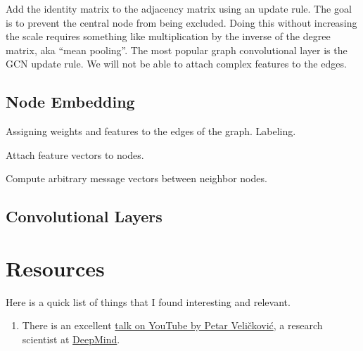 Add the identity matrix to the adjacency matrix using an update rule. 
The goal is to prevent the central node from being excluded. Doing this without increasing the scale requires something like multiplication by the inverse of the degree matrix, aka ``mean pooling''. The
most popular graph convolutional layer is the GCN update rule. We will not be able to attach complex features to the edges.

\subsection{\label{sec:embedding}Node Embedding}

\justifying
Assigning weights and features to the edges of the graph. Labeling.

Attach feature vectors to nodes.

Compute arbitrary message vectors between neighbor nodes.

\subsection{\label{sec:conv}Convolutional Layers}

\section{\label{sec:reading}Resources}

\justifying
Here is a quick list of things that I found interesting and relevant.

\begin{raggedright}
	\begin{enumerate}
		\item There is an excellent \href{https://www.youtube.com/watch?v=8owQBFAHw7E}{talk on YouTube by Petar Veličković}, a research scientist at \href{https://deepmind.com/about}{DeepMind}.
        \end{enumerate}
\end{raggedright}
\vspace{2mm}

\clearpage
\begin{versionhistory}
\end{versionhistory}
\nocite{*}




